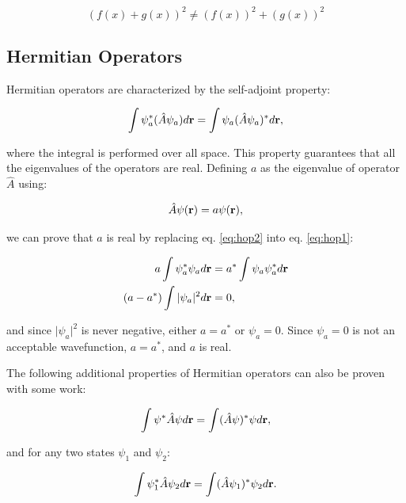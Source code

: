 \documentclass[
  9pt,
]{extbook}
\theoremstyle{definition}
\theoremstyle{definition}
\theoremstyle{definition}
\theoremstyle{remark}
\begin{document}
\begin{equation}
(f(x) + g(x))^2 \neq (f(x))^2 + (g(x))^2
\label{eq:linop3}
\end{equation}

\hypertarget{hermitian-operators}{%
\subsection{Hermitian Operators}\label{hermitian-operators}}

Hermitian operators are characterized by the self-adjoint property:

\begin{equation}
\int \psi_a^{*} (\hat{A} \psi_a)d{\bf r} =  \int \psi_a (\hat{A} \psi_a)^{*}d{\bf r},
\label{eq:hop1}
\end{equation}

where the integral is performed over all space. This property guarantees that all the eigenvalues of the operators are real. Defining \(a\) as the eigenvalue of operator \(\hat{A}\) using:

\begin{equation}
\hat{A} \psi({\bf r}) = a \psi({\bf r}),
\label{eq:hop2}
\end{equation}

we can prove that \(a\) is real by replacing eq. \eqref{eq:hop2} into eq. \eqref{eq:hop1}:

\begin{equation}
\begin{aligned}
a \int \psi_a^{*} \psi_a d{\bf r}&= a^{*} \int \psi_a \psi_a^{*} d{\bf r}\\
(a - a^{*}) \int \vert\psi_a\vert^2 d{\bf r} &= 0,
\end{aligned}
\label{eq:hop4}
\end{equation}

and since \(\vert\psi_a\vert^2\) is never negative, either \(a = a^{*}\) or \(\psi_a = 0\). Since \(\psi_a = 0\) is not an acceptable wavefunction, \(a = a^{*}\), and \(a\) is real.

The following additional properties of Hermitian operators can also be proven with some work:

\begin{equation}
\int \psi^{*}\hat{A} \psi d{\bf r} = \int (\hat{A} \psi)^{*} \psi d{\bf r},
\label{eq:hop2b}
\end{equation}

and for any two states \(\psi_1\) and \(\psi_2\):

\begin{equation}
\int \psi_1^{*} \hat{A} \psi_2 d{\bf r}=
\int (\hat{A} \psi_1)^{*} \psi_2 d{\bf r}.
\label{eq:hop3}
\end{equation}
\end{document}
